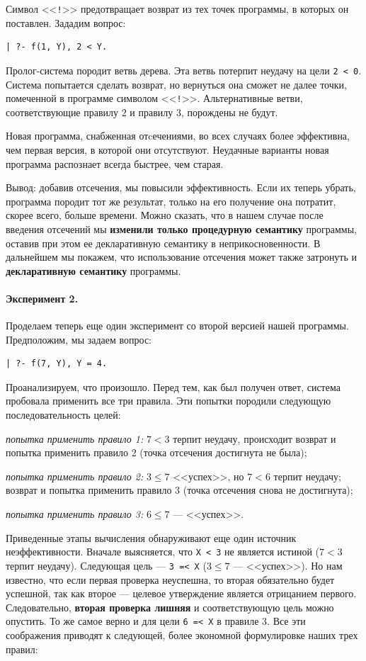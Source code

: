 \documentclass[12pt, openany, twoside]{book} %
\begin{document}
Символ <<{\tt !}>> предотвращает возврат из тех точек программы, в которых он поставлен. Зададим вопрос:
{\tt \begin{verbatim}
| ?- f(1, Y), 2 < Y.
\end{verbatim}}
\noindent Пролог-система породит ветвь дерева. Эта ветвь потерпит неудачу на цели {\tt 2~<~0}. Система попытается сделать возврат, но вернуться она сможет не далее точки, помеченной в программе символом <<{\tt !}>>. Альтернативные ветви, соответствующие правилу 2 и правилу 3, порождены не будут.

Новая программа, снабженная отcечениями, во всех случаях более эффективна, чем первая версия, в которой они отсутствуют. Неудачные варианты новая программа распознает всегда быстрее, чем старая.

Вывод: добавив отсечения, мы повысили эффективность. Если их теперь убрать, программа породит тот же результат, только на его получение она потратит, скорее всего, больше времени. Можно сказать, что в нашем случае после введения отсечений мы {\bf изменили только процедурную семантику} программы, оставив при этом ее декларативную семантику в неприкосновенности. В дальнейшем мы покажем, что использование отсечения может также затронуть и {\bf декларативную семантику} программы.

\paragraph{Эксперимент 2.} Проделаем теперь еще один эксперимент со второй версией нашей программы. Предположим, мы задаем вопрос:
{\tt \begin{verbatim}
| ?- f(7, Y), Y = 4.
\end{verbatim}}
\noindent Проанализируем, что произошло. Перед тем, как был получен ответ, система пробовала применить все три правила. Эти попытки породили следующую последовательность целей:

\noindent{}\emph{попытка применить правило 1:}
$7 < 3$ терпит неудачу, происходит возврат и попытка применить правило 2 (точка отсечения достигнута не была);

\noindent{}\emph{попытка применить правило 2:} $3\leq 7$ <<успех>>, но $7 < 6$ терпит неудачу; возврат и попытка применить правило 3 (точка отсечения снова не достигнута);

\noindent{}\emph{попытка применить правило 3:} {$6\leq 7$} --- <<успех>>.

Приведенные этапы вычисления обнаруживают еще один источник неэффективности. Вначале выясняется, что {\tt X < 3} не является истиной ($7 < 3$ терпит неудачу). Следующая цель --- {\tt 3~=<~X} ($3 \leq 7$ ---  <<успех>>). Но нам известно, что если первая проверка неуспешна, то вторая обязательно будет успешной, так как второе --- целевое утверждение является отрицанием первого. Следовательно, {\bf вторая проверка лишняя} и соответствующую цель можно опустить. То же самое верно и для цели {\tt 6~=<~X} в правиле 3. Все эти соображения приводят к следующей, более экономной формулировке наших трех правил:
\end{document}

